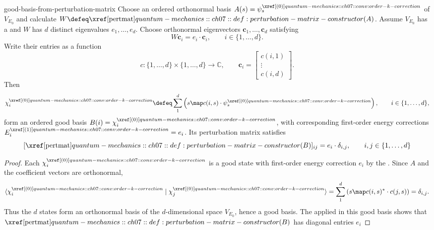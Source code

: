 \documentclass[12pt]{article}
\begin{document}
\begin{thm}{good-basis-from-perturbation-matrix}
  Choose an ordered orthonormal basis $A(s)=\psi_s^{\porder{0}}$ of $V_{E_0}$
  and calculate $W\defeq\pertmat(A)$.
  Assume $V_{E_0}$ has a  and $W$ has $d$ distinct eigenvalues $e_1,\ldots,e_d$.
  Choose orthonormal eigenvectors $\mathbf c_1,\ldots,\mathbf c_d$ satisfying
  \[
    W\mathbf c_i=e_i\cdot\mathbf c_i,
    \qquad i\in\{1,\ldots,d\}.
  \]
  Write their entries as a function
  \[
    c : \{1,\ldots,d\}\times\{1,\ldots,d\}\to\mathbb C,
    \qquad \mathbf c_i=\begin{bmatrix}c(i,1)\\\vdots\\c(i,d)\end{bmatrix}.
  \]
  Then
  \[
    \chi_i^{\porder{0}}\defeq
    \sum_1^d\left(s\map c(i,s)\cdot\psi_s^{\porder{0}}\right),
    \qquad i\in\{1,\ldots,d\},
  \]
  form an ordered good basis $B(i)=\chi_i^{\porder{0}}$, with corresponding first-order energy corrections $E_i^{\porder{1}}=e_i$.
  Its perturbation matrix satisfies
  \[
    [\pertmat(B)]_{ij}=e_i\cdot\delta_{i,j},
    \qquad i,j\in\{1,\ldots,d\}
  \]
\end{thm}

\begin{proof}
  Each $\chi_i^{\porder{0}}$ is a good state with first-order energy correction $e_i$ by the .
  Since $A$ and the coefficient vectors are orthonormal,
  \[
    \braket{\chi_i^{\porder{0}}\mid\chi_j^{\porder{0}}}
    =\sum_1^d\left(s\map c(i,s)^*\cdot c(j,s)\right)
    =\delta_{i,j}.
  \]
  Thus the $d$ states form an orthonormal basis of the $d$-dimensional space $V_{E_0}$, hence a good basis.
  The 
  applied in this good basis shows that $\pertmat(B)$ has diagonal entries $e_i$
\end{proof}

\end{document}

